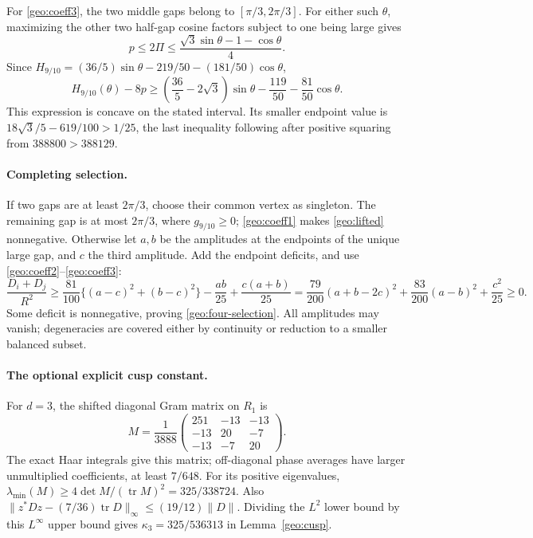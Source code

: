 For \eqref{geo:coeff3}, the two middle gaps belong to
\([\pi/3,2\pi/3]\). For either such \(\theta\), maximizing the other
two half-gap cosine factors subject to one being large gives
\[
 p\le2\Pi\le\frac{\sqrt3\sin\theta-1-\cos\theta}{4}.
\]
Since
\(H_{9/10}=(36/5)\sin\theta-219/50-(181/50)\cos\theta\),
\[
 H_{9/10}(\theta)-8p\ge
 \left(\frac{36}{5}-2\sqrt3\right)\sin\theta
             -\frac{119}{50}-\frac{81}{50}\cos\theta.
\]
This expression is concave on the stated interval. Its smaller
endpoint value is \(18\sqrt3/5-619/100>1/25\), the last inequality
following after positive squaring from \(388800>388129\).

\paragraph{Completing selection.}
If two gaps are at least \(2\pi/3\), choose their common vertex
as singleton. The remaining gap is at most \(2\pi/3\), where
\(g_{9/10}\ge0\); \eqref{geo:coeff1} makes \eqref{geo:lifted}
nonnegative.
Otherwise let \(a,b\) be the amplitudes at the endpoints of the
unique large gap, and \(c\) the third amplitude. Add the endpoint
deficits, and use \eqref{geo:coeff2}--\eqref{geo:coeff3}:
\[
 \frac{D_i+D_j}{R^2}\ge
 \frac{81}{100}\{(a-c)^2+(b-c)^2\}
      -\frac{ab}{25}+\frac{c(a+b)}{25}
 =\frac{79}{200}(a+b-2c)^2
  +\frac{83}{200}(a-b)^2+\frac{c^2}{25}\ge0.
\]
Some deficit is nonnegative, proving \eqref{geo:four-selection}.
All amplitudes may vanish; degeneracies are covered either by
continuity or reduction to a smaller balanced subset.

\paragraph{The optional explicit cusp constant.}
For \(d=3\), the shifted diagonal Gram matrix on \(R_1\) is
\[
 M=\frac1{3888}
 \begin{pmatrix}251&-13&-13\\-13&20&-7\\-13&-7&20\end{pmatrix}.
\]
The exact Haar integrals give this matrix; off-diagonal phase
averages have larger unmultiplied coefficients, at least \(7/648\).
For its positive eigenvalues,
\(\lambda_{\min}(M)\ge4\det M/(\operatorname{tr}M)^2=325/338724\).
Also
\(\|z^*Dz-(7/36)\operatorname{tr}D\|_\infty\le(19/12)\|D\|\).
Dividing the \(L^2\) lower bound by this \(L^\infty\) upper bound
gives \(\kappa_3=325/536313\) in Lemma~\ref{geo:cusp}.
